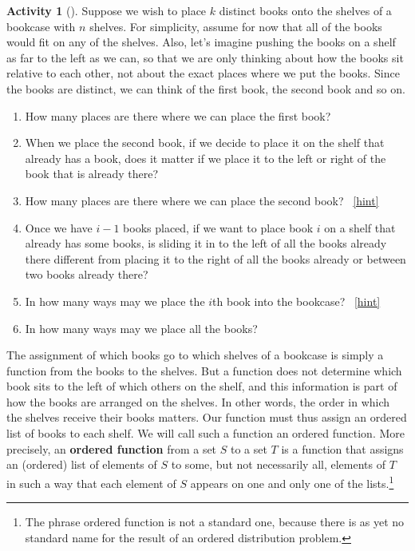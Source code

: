 \documentclass[10pt,]{book}
\newcommand{\terminology}[1]{\textbf{#1}}
\theoremstyle{plain}
\theoremstyle{definition}
\theoremstyle{definition}
\theoremstyle{definition}
\newtheorem{activity}[project]{Activity}
\numberwithin{equation}{chapter}
\begin{document}
\begin{activity}[]\label{bookcase}
\hypertarget{p-828}{}%
Suppose we wish to place \(k\) distinct books onto the shelves of a bookcase with \(n\) shelves. For simplicity, assume for now that all of the books would fit on any of the shelves. Also, let's imagine pushing the books on a shelf as far to the left as we can, so that we are only thinking about how the books sit relative to each other, not about the exact places where we put the books. Since the books are distinct, we can think of the first book, the second book and so on.%
\begin{enumerate}[font=\bfseries,label=(\alph*),ref=\alph*]
\item\label{task-163} \hypertarget{p-829}{}%
How many places are there where we can place the first book?%
\item\label{task-164} \hypertarget{p-831}{}%
When we place the second book, if we decide to place it on the shelf that already has a book, does it matter if we place it to the left or right of the book that is already there?%
\item\label{task-165} \hypertarget{p-833}{}%
How many places are there where we can place the second book?%
~\hfill{\tiny\hyperlink{a-124.c}{[hint]}\hypertarget{q-124.c}{}}\item\label{task-166} \hypertarget{p-836}{}%
Once we have \(i-1\) books placed, if we want to place book \(i\)  on a shelf that already has some books, is sliding it in to the left of all the books already there different from placing it to the right of all the books already or between two books already there?%
\item\label{task-167} \hypertarget{p-838}{}%
In how many ways may we place the \(i\)th book into the bookcase?%
~\hfill{\tiny\hyperlink{a-124.e}{[hint]}\hypertarget{q-124.e}{}}\item\label{task-168} \hypertarget{p-841}{}%
In how many ways may we place all the books?%
\end{enumerate}
\end{activity}
\hypertarget{p-843}{}%
The assignment of which books go to which shelves of a bookcase is simply a function from the books to the shelves. But a function does not determine which book sits to the left of which others on the shelf, and this information is part of how the books are arranged on the shelves. In other words, the order in which the shelves receive their books matters.  Our function must thus assign an ordered list of books to each shelf. We will call such a function an ordered function. More precisely, an \terminology{ordered function} from a set \(S\) to a set \(T\) is a function that assigns an (ordered) list of elements of \(S\) to some, but not necessarily all, elements of \(T\) in such a way that each element of \(S\) appears on one and only one of the lists.\footnote{The phrase ordered function is not a standard one, because there is as yet no standard name for the result of an ordered distribution problem.\label{fn-10}}%
\end{document}

